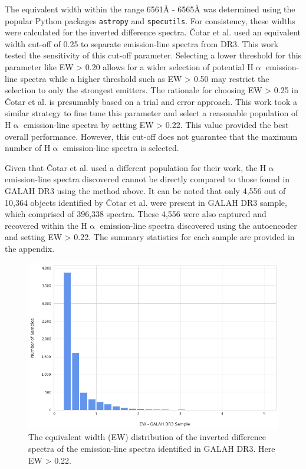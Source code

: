 The equivalent width within the range 6561\r{A} - 6565\r{A} was determined using the popular Python packages \texttt{astropy}\cite{astropy:2018}\cite{astropy:2013} and \texttt{specutils}\cite{specutils}. For consistency, these widths were calculated for the inverted difference spectra. Čotar et al. used an equivalent width cut-off of 0.25 to separate emission-line spectra from DR3. This work tested the sensitivity of this cut-off parameter. Selecting a lower threshold for this parameter like EW > 0.20 allows for a wider selection of potential H$\upalpha$ emission-line spectra while a higher threshold such as EW > 0.50 may restrict the selection to only the strongest emitters. The rationale for choosing EW > 0.25 in Čotar et al. is presumably based on a trial and error approach. This work took a similar strategy to fine tune this parameter and select a reasonable population of H$\upalpha$ emission-line spectra by setting EW > 0.22. This value provided the best overall performance. However, this cut-off does not guarantee that the maximum number of H$\upalpha$ emission-line spectra is selected. 

Given that Čotar et al. used a different population for their work, the H$\upalpha$ emission-line spectra discovered cannot be directly compared to those found in GALAH DR3 using the method above. It can be noted that only 4,556 out of 10,364 objects identified by Čotar et al. were present in GALAH DR3 sample, which comprised of 396,338 spectra. These 4,556 were also captured and recovered within the H$\upalpha$ emission-line spectra discovered using the autoencoder and setting EW > 0.22. The summary statistics for each sample are provided in the appendix.

\begin{figure}[!htb]
\centering
\includegraphics[scale=0.50]{figures/EW hist.png}
\caption{The equivalent width (EW) distribution of the inverted difference spectra of the emission-line spectra identified in GALAH DR3. Here EW > 0.22.}
\end{figure}


